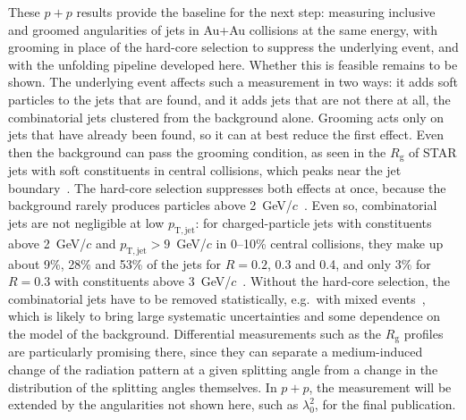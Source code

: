 These \(p+p\) results provide the baseline for the next step: measuring inclusive and groomed angularities of jets in Au+Au collisions at the same energy, with grooming in place of the hard-core selection to suppress the underlying event, and with the unfolding pipeline developed here.
%
Whether this is feasible remains to be shown.
%
The underlying event affects such a measurement in two ways: it adds soft particles to the jets that are found, and it adds jets that are not there at all, the combinatorial jets clustered from the background alone.
%
Grooming acts only on jets that have already been found, so it can at best reduce the first effect. 
%
Even then the background can pass the grooming condition, as seen in the \(R_\mathrm{g}\) of STAR jets with soft constituents in central \AuAu collisions, which peaks near the jet boundary~\cite{PhysRevC.105.044906}.
%
The hard-core selection suppresses both effects at once, because the background rarely produces particles above 2~GeV/\(c\)~\cite{PhysRevC.105.044906}.
%
Even so, combinatorial jets are not negligible at low \(p_\mathrm{T, jet}\): for charged-particle jets with constituents above 2~GeV/\(c\) and \(p_\mathrm{T, jet} > 9\)~GeV/\(c\) in 0--10\% central \AuAu collisions, they make up about 9\%, 28\% and 53\% of the jets for \(R = 0.2\), 0.3 and 0.4, and only 3\% for \(R = 0.3\) with constituents above 3~GeV/\(c\)~\cite{STAR:2026liw}.
%
Without the hard-core selection, the combinatorial jets have to be removed statistically, e.g.\ with mixed events~\cite{STAR:2017hhs,STAR:2026liw}, which is likely to bring large systematic uncertainties and some dependence on the model of the background.
%
Differential measurements such as the \(R_\mathrm{g}\) profiles are particularly promising there, since they can separate a medium-induced change of the radiation pattern at a given splitting angle from a change in the distribution of the splitting angles themselves.
%
In \(p+p\), the measurement will be extended by the angularities not shown here, such as \(\lambda_0^2\), for the final publication.

